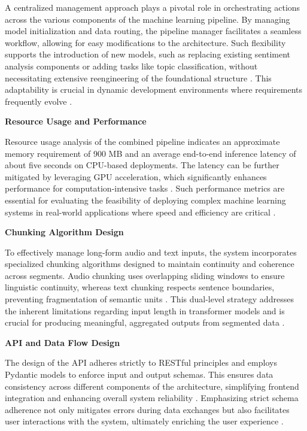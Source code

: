 A centralized management approach plays a pivotal role in orchestrating actions across the various components of the machine learning pipeline. By managing model initialization and data routing, the pipeline manager facilitates a seamless workflow, allowing for easy modifications to the architecture. Such flexibility supports the introduction of new models, such as replacing existing sentiment analysis components or adding tasks like topic classification, without necessitating extensive reengineering of the foundational structure \cite{10.1038/s41467-023-44599-9}. This adaptability is crucial in dynamic development environments where requirements frequently evolve \cite{SIM20242959}.

\textbf{Resource Usage and Performance}

Resource usage analysis of the combined pipeline indicates an approximate memory requirement of 900 MB and an average end-to-end inference latency of about five seconds on CPU-based deployments. The latency can be further mitigated by leveraging GPU acceleration, which significantly enhances performance for computation-intensive tasks \cite{10.36948/ijfmr.2024.v06i05.29550}. Such performance metrics are essential for evaluating the feasibility of deploying complex machine learning systems in real-world applications where speed and efficiency are critical \cite{bdcc3020028}.

\textbf{Chunking Algorithm Design}

To effectively manage long-form audio and text inputs, the system incorporates specialized chunking algorithms designed to maintain continuity and coherence across segments. Audio chunking uses overlapping sliding windows to ensure linguistic continuity, whereas text chunking respects sentence boundaries, preventing fragmentation of semantic units \cite{Ma2023AnIF}. This dual-level strategy addresses the inherent limitations regarding input length in transformer models and is crucial for producing meaningful, aggregated outputs from segmented data \cite{SIM20242959}.

\textbf{API and Data Flow Design}

The design of the API adheres strictly to RESTful principles and employs Pydantic models to enforce input and output schemas. This ensures data consistency across different components of the architecture, simplifying frontend integration and enhancing overall system reliability \cite{10.1016/j.heliyon.2024.e40855}. Emphasizing strict schema adherence not only mitigates errors during data exchanges but also facilitates user interactions with the system, ultimately enriching the user experience \cite{10.25236/ajets.2023.061118}.


